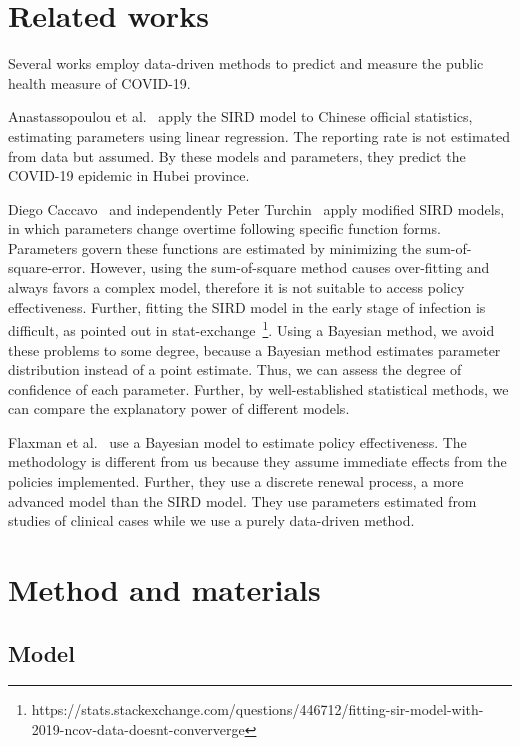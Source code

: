 \documentclass{amsart}
\begin{document}
\section{Related works}

Several works employ data-driven methods to predict and measure the public health measure of COVID-19.

Anastassopoulou et al.~\cite{Anastassopoulou2020} apply the SIRD model to Chinese official statistics, estimating parameters using linear regression.
The reporting rate is not estimated from data but assumed.
By these models and parameters, they predict the COVID-19 epidemic in Hubei province.

Diego Caccavo~\cite{Caccavo2020} and independently Peter Turchin~\cite{Turchin2020} apply modified SIRD models, in which parameters change overtime following specific function forms.
Parameters govern these functions are estimated by minimizing the sum-of-square-error.
However, using the sum-of-square method causes over-fitting and always favors a complex model, therefore it is not suitable to access policy effectiveness.
Further, fitting the SIRD model in the early stage of infection is difficult, as pointed out in stat-exchange~\footnote{https://stats.stackexchange.com/questions/446712/fitting-sir-model-with-2019-ncov-data-doesnt-conververge}.
Using a Bayesian method, we avoid these problems to some degree, because a Bayesian method estimates parameter distribution instead of a point estimate.
Thus, we can assess the degree of confidence of each parameter.
Further, by well-established statistical methods, we can compare the explanatory power of different models.

Flaxman et al.~\cite{Flaxman2020} use a Bayesian model to estimate policy effectiveness.
The methodology is different from us because they assume immediate effects from the policies implemented.
Further, they use a discrete renewal process, a more advanced model than the SIRD model.
They use parameters estimated from studies of clinical cases while we use a purely data-driven method.

\section{Method and materials}

\subsection{Model}
\end{document}
